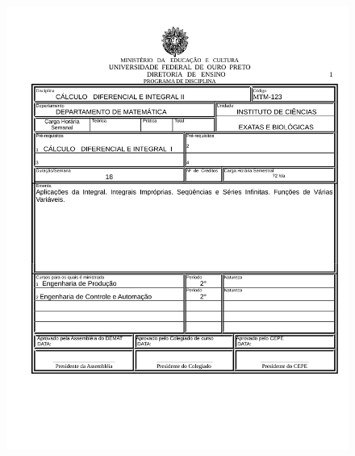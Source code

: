 \begin{figure}[p]
	\centering 
	\includegraphics[scale=0.7]{capitulos/anexo1-programas-disciplina/p25.pdf}
\end{figure}

